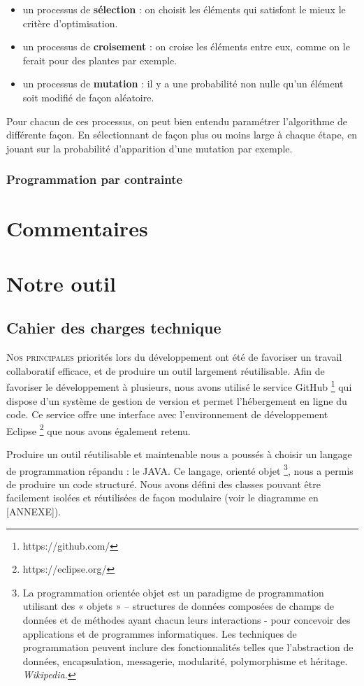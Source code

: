\begin{itemize}
\item un processus de \textbf{sélection} : on choisit les éléments qui satisfont le mieux le critère d'optimisation. \\
\item un processus de \textbf{croisement} : on croise les éléments entre eux, comme on le ferait pour des plantes par exemple. \\
\item un processus de \textbf{mutation} : il y a une probabilité non nulle qu'un élément soit modifié de façon aléatoire. \\
\end{itemize}

Pour chacun de ces processus, on peut bien entendu paramétrer l'algorithme de différente façon. En sélectionnant de façon plus ou moins large à chaque étape, en jouant sur la probabilité d'apparition d'une mutation par exemple.


\subsubsection*{Programmation par contrainte}
\section{Commentaires}
\section{Notre outil}

\subsection{Cahier des charges technique}
\lettrine{N}{os principales} priorités lors du développement ont été de favoriser un travail collaboratif efficace, et de produire un outil largement réutilisable.
Afin de favoriser le développement à plusieurs, nous avons utilisé le service GitHub \footnote{https://github.com/} qui dispose d'un système de gestion de version et permet l'hébergement en ligne du code. Ce service offre une interface avec l'environnement de développement Eclipse \footnote{https://eclipse.org/} que nous avons également retenu.

Produire un outil réutilisable et maintenable nous a poussés à choisir un langage de programmation répandu : le JAVA. Ce langage, orienté objet \footnote{La programmation orientée objet est un paradigme de programmation utilisant des « objets » – structures de données composées de champs de données et de méthodes ayant chacun leurs interactions - pour concevoir des applications et de programmes informatiques. Les techniques de programmation peuvent inclure des fonctionnalités telles que l'abstraction de données, encapsulation, messagerie, modularité, polymorphisme et héritage. \emph{Wikipedia.}}, nous a permis de produire un code structuré. Nous avons défini des classes pouvant être facilement isolées et réutilisées de façon modulaire (voir le diagramme en [ANNEXE]).


